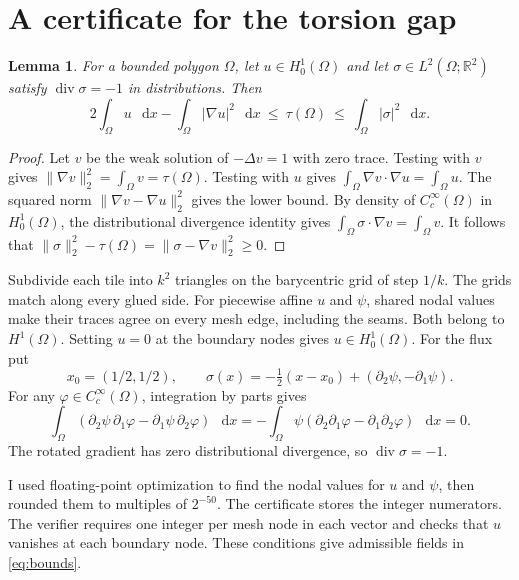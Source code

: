 \documentclass[11pt]{article}
\newtheorem{lemma}[theorem]{Lemma}
\newcommand{\dd}{\mathop{}\!\mathrm{d}}
\begin{document}
\section{A certificate for the torsion gap}\label{sec:certificate}

\begin{lemma}\label{lem:variational}
For a bounded polygon $\Omega$, let $u\in H^1_0(\Omega)$ and let
$\sigma\in L^2(\Omega;\mathbb R^2)$ satisfy
$\operatorname{div}\sigma=-1$ in distributions. Then
\begin{equation}\label{eq:bounds}
 2\int_\Omega u\,\dd x-\int_\Omega|\nabla u|^2\,\dd x
 \ \le\ \tau(\Omega)\ \le\ \int_\Omega|\sigma|^2\,\dd x .
\end{equation}
\end{lemma}

\begin{proof}
Let $v$ be the weak solution of $-\Delta v=1$ with zero trace.
Testing with $v$ gives $\|\nabla v\|_2^2=\int_\Omega v=\tau(\Omega)$.
Testing with $u$ gives $\int_\Omega\nabla v\cdot\nabla u=\int_\Omega u$.
The squared norm $\|\nabla v-\nabla u\|_2^2$ gives the lower bound.
By density of $C_c^\infty(\Omega)$ in $H^1_0(\Omega)$, the distributional
divergence identity gives $\int_\Omega \sigma\cdot\nabla v=\int_\Omega v$.
It follows that
$\|\sigma\|_2^2-\tau(\Omega)=\|\sigma-\nabla v\|_2^2\ge0$.
\end{proof}

Subdivide each tile into $k^2$ triangles on the barycentric grid of step
$1/k$. The grids match along every glued side. For piecewise affine
$u$ and $\psi$, shared nodal values make their traces agree on every
mesh edge, including the seams. Both belong to $H^1(\Omega)$. Setting
$u=0$ at the boundary nodes gives $u\in H^1_0(\Omega)$. For the flux put
\[
 x_0=(1/2,1/2),\qquad
 \sigma(x)=-\tfrac12(x-x_0)+(\partial_2\psi,-\partial_1\psi).
\]
For any $\varphi\in C_c^\infty(\Omega)$, integration by parts gives
\[
 \int_\Omega(\partial_2\psi\,\partial_1\varphi-\partial_1\psi\,\partial_2\varphi)\,\dd x
 =-\int_\Omega\psi(\partial_2\partial_1\varphi-\partial_1\partial_2\varphi)\,\dd x=0.
\]
The rotated gradient has zero distributional divergence, so
$\operatorname{div}\sigma=-1$.

I used floating-point optimization to find the nodal values for $u$
and $\psi$, then rounded them to multiples of $2^{-50}$. The certificate
stores the integer numerators. The verifier requires one integer per
mesh node in each vector and checks that $u$ vanishes at each boundary
node. These conditions give admissible fields in \eqref{eq:bounds}.
\end{document}
